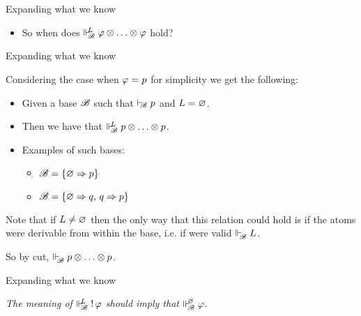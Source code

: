 \documentclass{beamer}
\begin{document}
\begin{frame}{Expanding what we know}
\begin{center}
\begin{itemize}
\item So when does $\Vdash_{ \!\!\mathscr{B} }^{ \!\!{L} } \varphi \otimes \ldots \otimes \varphi$ hold?
\end{itemize}
\end{center}
\end{frame}
\begin{frame}{Expanding what we know}
\begin{center}
Considering the case when $\varphi = {p}$ for simplicity we get the following:
\begin{itemize}
\pause
\item Given a base $\mathscr{B}$ such that $\vdash_{\!\!\mathscr{B}}{p}$ and ${L}=\varnothing$.
\pause
\item Then we have that $\Vdash_{ \!\!\mathscr{B} }^{ \!\!{L} }{p} \otimes \ldots \otimes {p}$.
\pause
\item Examples of such bases:
\begin{itemize}
	\item $\mathscr{B} = \{\varnothing \Rightarrow {p}\}$
	\item $\mathscr{B} = \{\varnothing \Rightarrow {q},\, {q}\Rightarrow {p} \}$
\end{itemize}
\pause
\end{itemize} 
\vspace{10pt}
Note that if $L \neq \varnothing$ then the only way that this relation could hold is if the atoms were derivable from within the base, i.e. if were valid $\Vdash_{ \!\!\mathscr{B} }^{ \!\! }L$.

So by cut, $\Vdash_{ \!\!\mathscr{B} }^{ \!\! }p\otimes \ldots \otimes p$. 
\end{center}
\end{frame}
\begin{frame}{Expanding what we know}
\begin{center}
\noindent
\emph{The meaning of $\Vdash_{ \!\!\mathscr{B} }^{ \!\!{L} }\mathop{!} \varphi$ should imply that $\Vdash_{ \!\!\mathscr{B} }^{ \!\!\varnothing }\varphi$.}
\end{center}
\end{frame}
\end{document}
